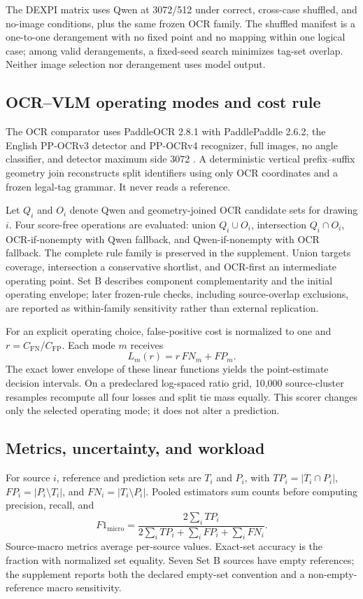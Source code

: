 \documentclass[11pt]{article}
\begin{document}
The DEXPI matrix uses Qwen at 3072/512 under correct, cross-case shuffled, and
no-image conditions, plus the same frozen OCR family. The shuffled manifest is
a one-to-one derangement with no fixed point and no mapping within one logical
case; among valid derangements, a fixed-seed search minimizes tag-set overlap.
Neither image selection nor derangement uses model output.

\subsection{OCR--VLM operating modes and cost rule}

The OCR comparator uses PaddleOCR 2.8.1 with PaddlePaddle 2.6.2, the English
PP-OCRv3 detector and PP-OCRv4 recognizer, full images, no angle classifier,
and detector maximum side 3072 \cite{du2020}. A deterministic vertical
prefix--suffix geometry join reconstructs split identifiers using only OCR
coordinates and a frozen legal-tag grammar. It never reads a reference.

Let $Q_i$ and $O_i$ denote Qwen and geometry-joined OCR candidate sets for
drawing $i$. Four score-free operations are evaluated: union $Q_i\cup O_i$,
intersection $Q_i\cap O_i$, OCR-if-nonempty with Qwen fallback, and
Qwen-if-nonempty with OCR fallback. The complete rule family is preserved in
the supplement. Union targets coverage, intersection a conservative shortlist,
and OCR-first an intermediate operating point. Set B describes component
complementarity and the initial operating envelope; later frozen-rule checks,
including source-overlap exclusions, are reported as within-family sensitivity
rather than external replication.

For an explicit operating choice, false-positive cost is normalized to one
and $r=C_{\mathrm{FN}}/C_{\mathrm{FP}}$. Each mode $m$ receives
\[
L_m(r)=r\,FN_m+FP_m.
\]
The exact lower envelope of these linear functions yields the point-estimate
decision intervals. On a predeclared log-spaced ratio grid, 10,000
source-cluster resamples recompute all four losses and split tie mass equally.
This scorer changes only the selected operating mode; it does not alter a
prediction.

\subsection{Metrics, uncertainty, and workload}

For source $i$, reference and prediction sets are $T_i$ and $P_i$, with
$TP_i=|T_i\cap P_i|$, $FP_i=|P_i\setminus T_i|$, and
$FN_i=|T_i\setminus P_i|$. Pooled estimators sum counts before computing
precision, recall, and
\[
F1_{\mathrm{micro}}=
\frac{2\sum_iTP_i}{2\sum_iTP_i+\sum_iFP_i+\sum_iFN_i}.
\]
Source-macro metrics average per-source values. Exact-set accuracy is the
fraction with normalized set equality. Seven Set B sources have empty
references; the supplement reports both the declared empty-set convention and
a non-empty-reference macro sensitivity.
\end{document}
